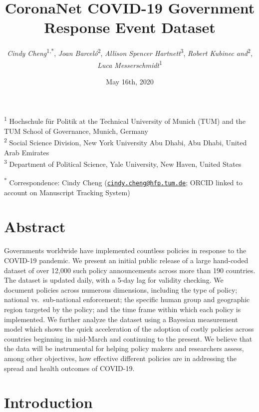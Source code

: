 \documentclass[]{article}
\title{CoronaNet COVID-19 Government Response Event Dataset}
\author{\emph{Cindy Cheng}\textsuperscript{1,*}, \emph{Joan Barceló}\textsuperscript{2}, \emph{Allison Spencer Hartnett}\textsuperscript{3}, \emph{Robert Kubinec and}\textsuperscript{2}, \\ \emph{ Luca Messerschmidt}\textsuperscript{1}}
\date{May 16th, 2020}
\begin{document}
\maketitle

\textsuperscript{1} Hochschule für Politik at the Technical University of Munich (TUM) and the TUM School of Governance, Munich, Germany\\
\textsuperscript{2} Social Science Division, New York University Abu Dhabi, Abu Dhabi, United Arab Emirates\\
\textsuperscript{3} Department of Political Science, Yale University, New Haven, United States

\textsuperscript{*} Correspondence: Cindy Cheng (\href{mailto:cindy.cheng@hfp.tum.de}{\href{mailto:cindy.cheng@hfp.tum.de}{\nolinkurl{cindy.cheng@hfp.tum.de}}}; ORCID linked to account on Manuscript Tracking System)

\newpage

\hypertarget{abstract}{%
\section*{Abstract}\label{abstract}}

Governments worldwide have implemented countless policies in response to the COVID-19 pandemic. We present an initial public release of a large hand-coded dataset of over 12,000 such policy announcements across more than 190 countries. The dataset is updated daily, with a 5-day lag for validity checking. We document policies across numerous dimensions, including the type of policy; national vs.~sub-national enforcement; the specific human group and geographic region targeted by the policy; and the time frame within which each policy is implemented. We further analyze the dataset using a Bayesian measurement model which shows the quick acceleration of the adoption of costly policies across countries beginning in mid-March and continuing to the present. We believe that the data will be instrumental for helping policy makers and researchers assess, among other objectives, how effective different policies are in addressing the spread and health outcomes of COVID-19.

\hypertarget{introduction}{%
\section*{Introduction}\label{introduction}}
\end{document}

